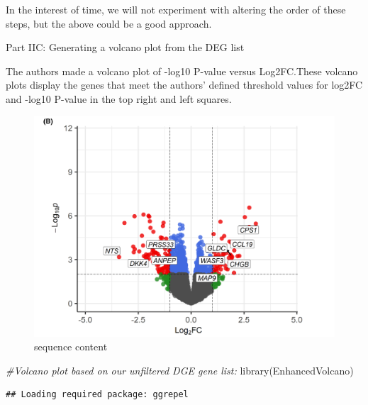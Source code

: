 \documentclass[
]{article}
\newenvironment{Shaded}{\begin{snugshade}}{\end{snugshade}}
\newcommand{\CommentTok}[1]{\textcolor[rgb]{0.56,0.35,0.01}{\textit{#1}}}
\newcommand{\FunctionTok}[1]{\textcolor[rgb]{0.00,0.00,0.00}{#1}}
\newcommand{\NormalTok}[1]{#1}
\begin{document}
In the interest of time, we will not experiment with altering the order
of these steps, but the above could be a good approach.

Part IIC: Generating a volcano plot from the DEG list

The authors made a volcano plot of -log10 P-value versus Log2FC.These
volcano plots display the genes that meet the authors' defined threshold
values for \textbar log2FC\textbar{} and -log10 P-value in the top right
and left squares.

\begin{figure}
\centering
\includegraphics{./paper_volcano.png}
\caption{sequence content}
\end{figure}

\begin{Shaded}
\begin{Highlighting}[]
\CommentTok{\#Volcano plot based on our unfiltered DGE gene list:}
\FunctionTok{library}\NormalTok{(EnhancedVolcano)}
\end{Highlighting}
\end{Shaded}

\begin{verbatim}
## Loading required package: ggrepel
\end{verbatim}
\end{document}
